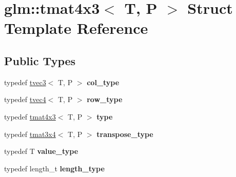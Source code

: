 \hypertarget{structglm_1_1tmat4x3}{}\section{glm\+:\+:tmat4x3$<$ T, P $>$ Struct Template Reference}
\label{structglm_1_1tmat4x3}
\subsection*{Public Types}
\begin{DoxyCompactItemize}
\item 
\mbox{\label{structglm_1_1tmat4x3_ac64f78f27c32014f7d72233969526430}} 
typedef \hyperlink{structglm_1_1tvec3}{tvec3}$<$ T, P $>$ {\bfseries col\+\_\+type}
\item 
\mbox{\label{structglm_1_1tmat4x3_aeed2de6aadeb405b11529071cddb9fe9}} 
typedef \hyperlink{structglm_1_1tvec4}{tvec4}$<$ T, P $>$ {\bfseries row\+\_\+type}
\item 
\mbox{\label{structglm_1_1tmat4x3_a3aedff8ef82d31052444d388ededef55}} 
typedef \hyperlink{structglm_1_1tmat4x3}{tmat4x3}$<$ T, P $>$ {\bfseries type}
\item 
\mbox{\label{structglm_1_1tmat4x3_a367488f91f7e419b75ddee7fe2d44a20}} 
typedef \hyperlink{structglm_1_1tmat3x4}{tmat3x4}$<$ T, P $>$ {\bfseries transpose\+\_\+type}
\item 
\mbox{\label{structglm_1_1tmat4x3_ad877c31a46be38d67ef6e93881c44ecf}} 
typedef T {\bfseries value\+\_\+type}
\item 
\mbox{\label{structglm_1_1tmat4x3_a2f1ac502cc552a921a905e8a858fb1d7}} 
typedef length\+\_\+t {\bfseries length\+\_\+type}
\end{DoxyCompactItemize}
